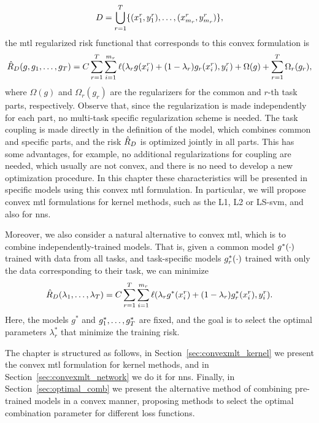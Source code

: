 $$D = \bigcup_{r=1}^T \{(x_1^r, y_1^r), \ldots, (x_{m_r}^r, y_{m_r}^r)\},$$
the \acrshort{mtl} regularized risk functional that corresponds to this convex formulation is 
\begin{equation}
    \nonumber
    \hat{R}_{D} ({g, g_1, \ldots, g_T}) = C\sum_{r=1}^{T} \sum_{i=1}^{m_r} \ell(\lambda_r g(x_i^r) + (1 - \lambda_r) g_r(x_i^r), y_i^r) + \Omega(g) + \sum_{r=1}^T \Omega_r(g_r) ,
\end{equation}
where $\Omega(g)$ and $\Omega_r(g_r)$ are the regularizers for the common and $r$-th task parts, respectively. Observe that, since the regularization is made independently for each part, no multi-task specific regularization scheme is needed. The task coupling is made directly in the definition of the model, which combines common and specific parts, and the risk $\hat{R}_{D}$ is optimized jointly in all parts.
This has some advantages, for example, no additional regularizations for coupling are needed, which usually are not convex, and there is no need to develop a new optimization procedure. In this chapter these characteristics will be presented in specific models using this convex \acrshort{mtl} formulation. In particular, we will propose convex \acrshort{mtl} formulations for kernel methods, such as the L1, L2 or LS-\acrfull{svm}, and also for \acrfull{nns}.
%

Moreover, we also consider a natural alternative to convex \acrshort{mtl}, which is to combine independently-trained models. That is, given a common model ${g}^*(\cdot)$ trained with data from all tasks, and task-specific models ${g}^*_r(\cdot)$ trained with only the data corresponding to their task, we can minimize 
\begin{equation}
    \nonumber
    \hat{R}_{D} (\lambda_1, \ldots, \lambda_T) = C\sum_{r=1}^{T} \sum_{i=1}^{m_r} \ell(\lambda_r g^*(x_i^r) + (1 - \lambda_r) g^*_r(x_i^r), y_i^r)  .
\end{equation}
Here, the models $g^*$ and $g^*_1, \ldots, g^*_T$ are fixed, and the goal is to select the optimal parameters $\lambda^*_r$ that minimize the training risk.

%
The chapter is structured as follows, in Section~\ref{sec:convexmlt_kernel} we present the convex \acrshort{mtl} formulation for kernel methods, and in Section~\ref{sec:convexmlt_network} we do it for \acrshort{nns}.
Finally, in Section~\ref{sec:optimal_comb} we present the alternative method of combining pre-trained models in a convex manner, proposing methods to select the optimal combination parameter for different loss functions.
%




